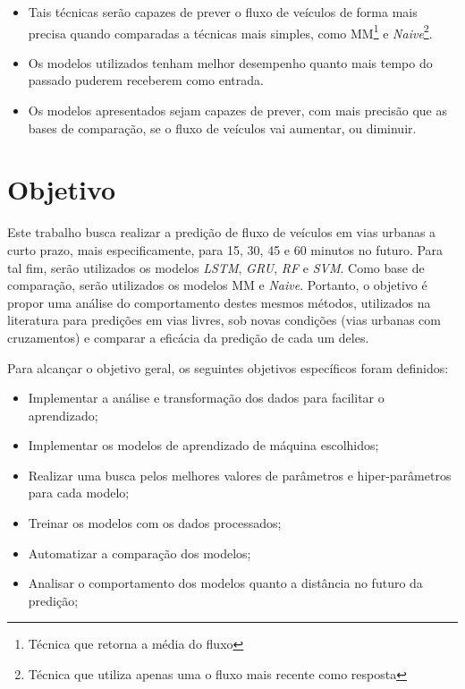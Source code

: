 \begin{itemize}
    \item Tais técnicas serão capazes de prever o fluxo de veículos de forma mais precisa quando comparadas a técnicas mais simples, como \acrfull{MM}\footnote{Técnica que retorna a média do fluxo} e \textit{Naive}\footnote{Técnica que utiliza apenas uma o fluxo mais recente como resposta}.
    \item Os modelos utilizados tenham melhor desempenho quanto mais tempo do passado puderem receberem como entrada.
    \item Os modelos apresentados sejam capazes de prever, com mais precisão que as bases de comparação, se o fluxo de veículos vai aumentar, ou diminuir.
\end{itemize}


\section{Objetivo}
\label{section:objectives}
Este trabalho busca realizar a predição de fluxo de veículos em vias urbanas a curto prazo, mais especificamente, para 15, 30, 45 e 60 minutos no futuro. Para tal fim, serão utilizados os modelos \textit{\acrfull{LSTM}}, \textit{\acrfull{GRU}}, \textit{\acrfull{RF}} e \textit{\acrfull{SVM}}. Como base de comparação, serão utilizados os modelos \acrshort{MM} e \textit{Naive}. Portanto, o objetivo é propor uma análise do comportamento destes mesmos métodos, utilizados na literatura para predições em vias livres, sob novas condições (vias urbanas com cruzamentos) e comparar a eficácia da predição de cada um deles.

Para alcançar o objetivo geral, os seguintes objetivos específicos foram definidos:

\begin{itemize}
    \item Implementar a análise e transformação dos dados para facilitar o aprendizado;
    \item Implementar os modelos de aprendizado de máquina escolhidos; 
    \item Realizar uma busca pelos melhores valores de parâmetros e hiper-parâmetros para cada modelo;
    \item Treinar os modelos com os dados processados;
    \item Automatizar a comparação dos modelos;
    \item Analisar o comportamento dos modelos quanto a distância no futuro da predição;
\end{itemize}

